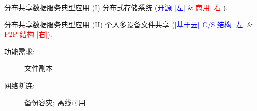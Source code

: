 \begin{frame}{分布共享数据服务典型应用 (I)}
  {分布式存储系统 (\textcolor{blue}{\scriptsize 开源 [左]} \& \textcolor{red}{\scriptsize 商用 [右]}).}

\end{frame}
\begin{frame}{分布共享数据服务典型应用 (II)}
  {个人多设备文件共享 {(\textcolor{blue}{\scriptsize [基于云] C/S 结构 [左]} \& 
  \textcolor{red}{\scriptsize P2P 结构 [右]}).}}

  \begin{description}
    \item[功能需求:] 文件副本 
    \item[网络断连:] 备份容灾; 离线可用
  \end{description}
\end{frame}
% 
